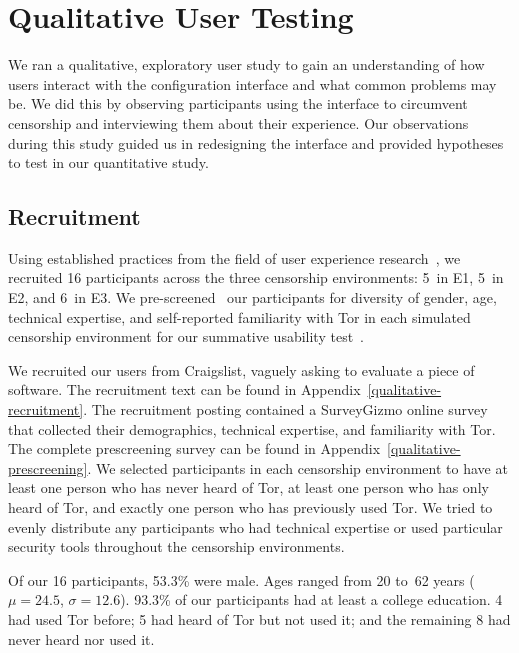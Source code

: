 \documentclass[USenglish,oneside,twocolumn]{article}
\begin{document}
\section{Qualitative User Testing}
{\color {red}
\label{sec:qualitative}
We ran a qualitative, exploratory user study to gain an 
understanding of how users interact with the configuration interface and
what common problems may be. We did this by observing participants using 
the interface to circumvent censorship and interviewing them about
their experience.  Our observations during this study guided us in
redesigning the interface and provided hypotheses to test in our quantitative study.

\subsection{Recruitment}
Using established practices from the field of user experience research~\cite{howmanyusers},
we recruited 16 participants across the three censorship environments:
5~in E1, 5~in E2, and 6~in E3.
We pre-screened~\cite{screening} our participants for diversity of gender, age, technical expertise,
and self-reported familiarity with Tor in each simulated censorship environment for our summative
usability test~\cite{summative}. 

We recruited our users from Craigslist, vaguely asking to evaluate a piece of software. 
The recruitment text can be found in Appendix~\ref{qualitative-recruitment}. The recruitment posting contained a 
SurveyGizmo online survey that collected their demographics, technical expertise, and familiarity with Tor.
The complete prescreening survey can be found in Appendix~\ref{qualitative-prescreening}.  
We selected participants in each censorship environment to have at least one person who has never heard of Tor, 
at least one person who has only heard of Tor, and exactly one person who has previously used Tor. We tried to evenly distribute any participants who had technical
expertise or used particular security tools throughout the censorship environments. 

Of our 16 participants, 53.3\% were male. 
Ages ranged from 20 to~62 years
($\mu = 24.5$, $\sigma = 12.6$). 
93.3\% of our participants had at least
a college education.
4 had used Tor before;
5 had heard of Tor but not used it;
and the remaining 8 had never heard nor used it.


}
\end{document}

